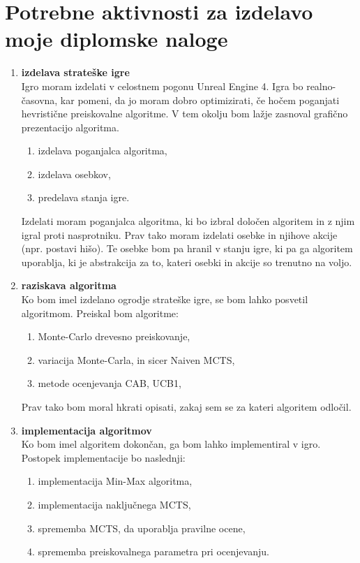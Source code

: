 \documentclass[11pt,a4paper]{article}
\begin{document}
\section{Potrebne aktivnosti za izdelavo moje diplomske naloge}
\begin{enumerate}
	\item \textbf{izdelava strateške igre}\\
	Igro moram izdelati v celostnem pogonu Unreal Engine 4.
	Igra bo realno-časovna, kar pomeni, da jo moram dobro optimizirati, če hočem poganjati hevristične preiskovalne algoritme. V tem okolju bom lažje zasnoval grafično prezentacijo algoritma.
	\begin{enumerate}
		\item izdelava poganjalca algoritma,
		\item izdelava osebkov,
		\item predelava stanja igre.
	\end{enumerate}
	Izdelati moram poganjalca algoritma, ki bo izbral določen algoritem in z njim igral proti nasprotniku.
	Prav tako moram izdelati osebke in njihove akcije (npr. postavi hišo).
	Te osebke bom pa hranil v stanju igre, ki pa ga algoritem uporablja, ki je abstrakcija za to, kateri osebki in akcije so trenutno na voljo.
	
	
	\item \textbf{raziskava algoritma}\\
	Ko bom imel izdelano ogrodje strateške igre, se bom lahko posvetil algoritmom.
	Preiskal bom algoritme:
	\begin{enumerate}
		\item Monte-Carlo drevesno preiskovanje,
		\item variacija Monte-Carla, in sicer Naiven MCTS,
		\item metode ocenjevanja CAB, UCB1,
	\end{enumerate}
	Prav tako bom moral hkrati opisati, zakaj sem se za kateri algoritem odločil.
	
	\item \textbf{implementacija algoritmov}\\
	Ko bom imel algoritem dokončan, ga bom lahko implementiral v igro.
	Postopek implementacije bo naslednji:
	\begin{enumerate}
		\item implementacija Min-Max algoritma,
		\item implementacija naključnega MCTS,
		\item sprememba MCTS, da uporablja pravilne ocene,
		\item sprememba preiskovalnega parametra pri ocenjevanju.
	\end{enumerate}
	

\end{enumerate}
\end{document}
